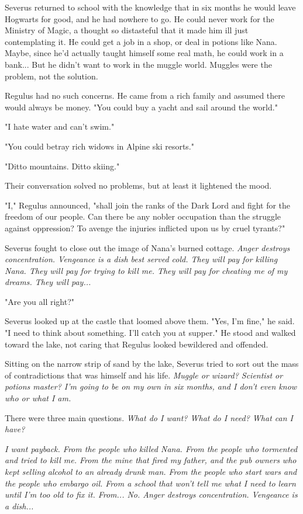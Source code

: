 Severus returned to school with the knowledge that in six months he would leave Hogwarts for good, and he had nowhere to go. He could never work for the Ministry of Magic, a thought so distasteful that it made him ill just contemplating it. He could get a job in a shop, or deal in potions like Nana. Maybe, since he'd actually taught himself some real math, he could work in a bank... But he didn't want to work in the muggle world. Muggles were the problem, not the solution.

Regulus had no such concerns. He came from a rich family and assumed there would always be money. "You could buy a yacht and sail around the world."

"I hate water and can't swim."

"You could betray rich widows in Alpine ski resorts."

"Ditto mountains. Ditto skiing."

Their conversation solved no problems, but at least it lightened the mood.

"I," Regulus announced, "shall join the ranks of the Dark Lord and fight for the freedom of our people. Can there be any nobler occupation than the struggle against oppression? To avenge the injuries inflicted upon us by cruel tyrants?"

Severus fought to close out the image of Nana's burned cottage. \emph{Anger destroys concentration. Vengeance is a dish best served cold. They will pay for killing Nana. They will pay for trying to kill me. They will pay for cheating me of my dreams. They will pay...}

"Are you all right?"

Severus looked up at the castle that loomed above them. "Yes, I'm fine," he said. "I need to think about something. I'll catch you at supper." He stood and walked toward the lake, not caring that Regulus looked bewildered and offended.

Sitting on the narrow strip of sand by the lake, Severus tried to sort out the mass of contradictions that was himself and his life. \emph{Muggle or wizard? Scientist or potions master? I'm going to be on my own in six months, and I don't even know who or what I am.}

There were three main questions. \emph{What do I want? What do I need? What can I have?}

\emph{I want payback. From the people who killed Nana. From the people who tormented and tried to kill me. From the mine that fired my father, and the pub owners who kept selling alcohol to an already drunk man. From the people who start wars and the people who embargo oil. From a school that won't tell me what I need to learn until I'm too old to fix it. From... No. Anger destroys concentration. Vengeance is a dish...}

